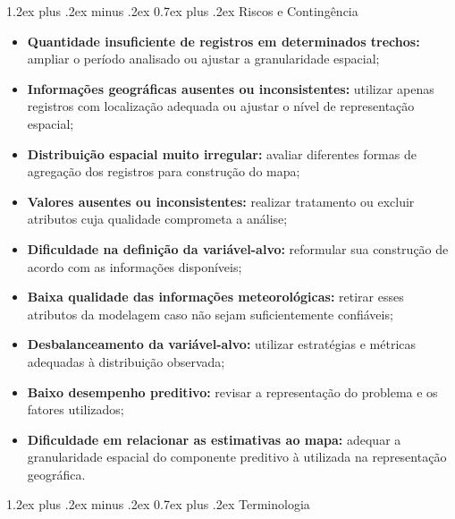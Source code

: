 \documentclass[11pt,a4paper]{article}
\makeatletter
\renewcommand\subsection{
\@startsection{subsection}{2}{0pt}%
{1.2ex plus .2ex minus .2ex}%
{0.7ex plus .2ex}%
{\normalfont\large\bfseries}
}
\makeatother
\begin{document}
\subsection{Riscos e Contingência}

\begin{itemize}

    \item \textbf{Quantidade insuficiente de registros em determinados trechos:}
    ampliar o período analisado ou ajustar a granularidade espacial;

    \item \textbf{Informações geográficas ausentes ou inconsistentes:}
    utilizar apenas registros com localização adequada ou ajustar o nível de representação espacial;

    \item \textbf{Distribuição espacial muito irregular:}
    avaliar diferentes formas de agregação dos registros para construção do mapa;

    \item \textbf{Valores ausentes ou inconsistentes:}
    realizar tratamento ou excluir atributos cuja qualidade comprometa a análise;

    \item \textbf{Dificuldade na definição da variável-alvo:}
    reformular sua construção de acordo com as informações disponíveis;

    \item \textbf{Baixa qualidade das informações meteorológicas:}
    retirar esses atributos da modelagem caso não sejam suficientemente confiáveis;

    \item \textbf{Desbalanceamento da variável-alvo:}
    utilizar estratégias e métricas adequadas à distribuição observada;

    \item \textbf{Baixo desempenho preditivo:}
    revisar a representação do problema e os fatores utilizados;

    \item \textbf{Dificuldade em relacionar as estimativas ao mapa:}
    adequar a granularidade espacial do componente preditivo à utilizada na representação geográfica.

\end{itemize}


\subsection{Terminologia}
\end{document}
